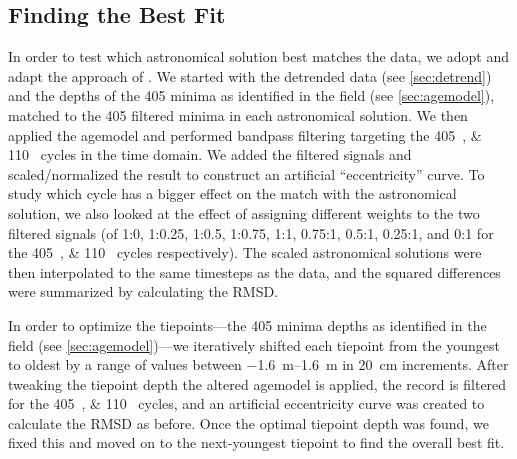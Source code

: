\documentclass[draft]{agujournal2019}
\begin{document}
\subsection{Finding the Best Fit}\label{sec:algorithm}

In order to test which astronomical solution best matches the data, we adopt
and adapt the approach of . We
started with the detrended data (see \cref{sec:detrend}) and the depths of the
\qty{405}{\kiloyear} minima as identified in the field (see
\cref{sec:agemodel}), matched to the \qty{405}{\kiloyear} filtered minima in
each astronomical solution. We then applied the agemodel and performed bandpass
filtering targeting the \qtylist{405;110}{\kiloyear} cycles in the time domain.
We added the filtered signals and scaled/normalized the result to construct an
artificial ``eccentricity'' curve. To study which cycle has a bigger effect on
the match with the astronomical solution, we also looked at the effect of
assigning different weights to the two filtered signals (of 1:0, 1:0.25, 1:0.5,
1:0.75, 1:1, 0.75:1, 0.5:1, 0.25:1, and 0:1 for the
\qtylist{405;110}{\kiloyear} cycles respectively). The scaled astronomical
solutions were then interpolated to the same timesteps as the data, and the
squared differences were summarized by calculating the \gls{RMSD}.

In order to optimize the tiepoints---the \qty{405}{\kiloyear} minima depths as
identified in the field (see \cref{sec:agemodel})---we iteratively shifted each
tiepoint from the youngest to oldest by a range of values between
\qtyrange[range-phrase=~to~]{-1.6}{1.6}{\metre} in \qty{20}{\centi\metre}
increments. After tweaking the tiepoint depth the altered agemodel is applied,
the record is filtered for the \qtylist{405;110}{\kiloyear} cycles, and an
artificial eccentricity curve was created to calculate the \gls{RMSD} as
before. Once the optimal tiepoint depth was found, we fixed this and moved on
to the next-youngest tiepoint to find the overall best fit.
\end{document}
